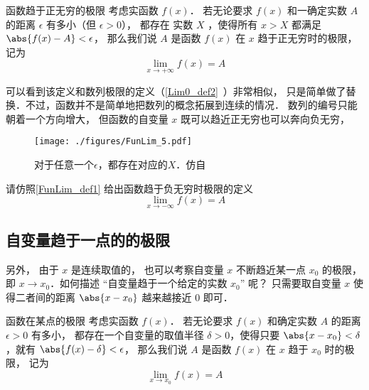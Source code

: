 \begin{definition}{函数趋于正无穷的极限}\label{FunLim_def1}
考虑实函数 $f(x)$． 若无论要求 $f(x)$ 和一确定实数 $A$ 的距离 $\epsilon$ 有多小（但 $\epsilon>0$）， 都存在 实数 $X$ ，使得所有 $x>X$ 都满足 $\abs{f(x)-A}<\epsilon$， 那么我们说 $A$ 是函数 $f(x)$ 在 $x$ 趋于正无穷时的极限， 记为
\begin{equation}
\lim\limits_{x\to +\infty} f(x) = A
\end{equation}
\end{definition}

可以看到该定义和数列极限的定义（\autoref{Lim0_def2}~）非常相似， 只是简单做了替换．不过，函数并不是简单地把数列的概念拓展到连续的情况． 数列的编号只能朝着一个方向增大， 但函数的自变量 $x$ 既可以趋近正无穷也可以奔向负无穷， 

\begin{figure}[ht]
\centering
\texttt{[image: ./figures/FunLim\_5.pdf]}
\caption{对于任意一个$\epsilon$，都存在对应的$X$．仿自\cite{Thomas}} \label{FunLim_fig5}
\end{figure}

\begin{exercise}{}
请仿照\autoref{FunLim_def1} 给出函数趋于负无穷时极限的定义
\begin{equation}
\lim\limits_{x\to -\infty} f(x) = A
\end{equation}
\end{exercise}

\subsection{自变量趋于一点的的极限}
另外， 由于 $x$ 是连续取值的， 也可以考察自变量 $x$ 不断趋近某一点 $x_0$ 的极限， 即 $x\to x_0$．如何描述 “自变量趋于一个给定的实数 $x_0$” 呢？ 只需要取自变量 $x$ 使得二者间的距离 $\abs{x-x_0}$ 越来越接近 $0$ 即可．
\begin{definition}{函数在某点的极限}\label{FunLim_def3}
考虑实函数 $f(x)$． 若无论要求 $f(x)$ 和确定实数 $A$ 的距离 $\epsilon>0$ 有多小， 都存在一个自变量的取值半径 $\delta>0$，使得只要 $\abs{x-x_0} < \delta$，就有 $\abs{f(x)-\delta}<\epsilon$，
那么我们说 $A$ 是函数 $f(x)$ 在 $x$ 趋于 $x_0$ 时的极限， 记为
\begin{equation}
\lim\limits_{x\to x_0}f(x)=A
\end{equation}
\end{definition}

